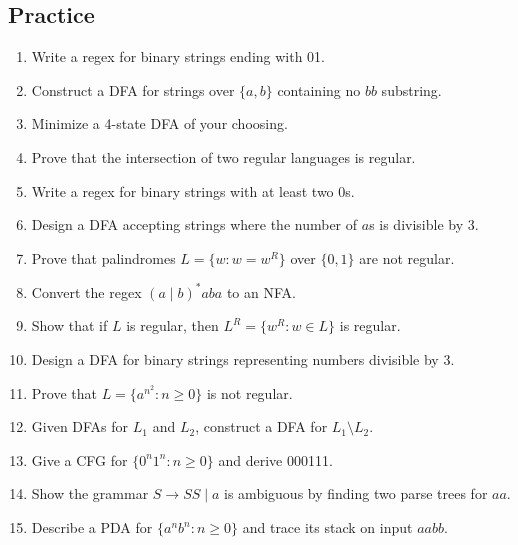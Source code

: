 \subsection*{Practice}
\begin{enumerate}
  \item Write a regex for binary strings ending with 01.

  \item Construct a DFA for strings over $\{a, b\}$ containing no $bb$ substring.

  \item Minimize a 4-state DFA of your choosing.

  \item Prove that the intersection of two regular languages is regular.

  \item Write a regex for binary strings with at least two 0s.

  \item Design a DFA accepting strings where the number of $a$s is divisible by 3.

  \item Prove that palindromes $L = \{w : w = w^R\}$ over $\{0,1\}$ are not regular.

  \item Convert the regex $(a \mid b)^*aba$ to an NFA.

  \item Show that if $L$ is regular, then $L^R = \{w^R : w \in L\}$ is regular.

  \item Design a DFA for binary strings representing numbers divisible by 3.

  \item Prove that $L = \{a^{n^2} : n \geq 0\}$ is not regular.

  \item Given DFAs for $L_1$ and $L_2$, construct a DFA for $L_1 \setminus L_2$.

  \item Give a CFG for $\{0^n1^n : n \geq 0\}$ and derive 000111.

  \item Show the grammar $S \to SS \mid a$ is ambiguous by finding two parse trees for $aa$.

  \item Describe a PDA for $\{a^n b^n : n \geq 0\}$ and trace its stack on input $aabb$.
\end{enumerate}
